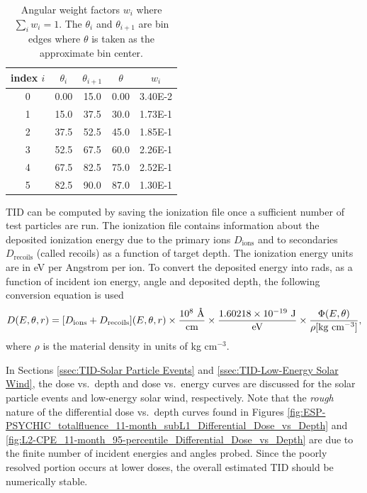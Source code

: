 \documentclass{hitec}
\newcommand{\angstrom}{\mbox{\normalfont\AA}}
\begin{document}
\begin{table}[h]\centering
	\caption{Angular weight factors $w_i$ where $\sum_i w_i = 1$. The $\theta_i$ and $\theta_{i+1}$ are bin edges where $\theta$ is taken as the approximate bin center.}\label{tab:incidentAngleBins}
	\begin{tabular}{|c | c | c | c | c |}\hline
		index $i$ & $\theta_i$ & $\theta_{i+1}$ & $\theta$ & $w_i$ \\\hline
		0  & 0.00 & 15.0 & 0.00 & 3.40E-2 \\\hline
		1  & 15.0 & 37.5 & 30.0 & 1.73E-1 \\\hline
		2  & 37.5 & 52.5 & 45.0 & 1.85E-1\\\hline
		3  & 52.5 & 67.5 & 60.0 & 2.26E-1 \\\hline
		4  & 67.5 & 82.5 & 75.0 & 2.52E-1\\\hline
		5  & 82.5 & 90.0 & 87.0 & 1.30E-1\\\hline
	\end{tabular}
\end{table}

TID can be computed by saving the ionization file once a sufficient number of test particles are run. The ionization file contains information about the deposited ionization energy due to the primary ions $D_{\text{ions}}$ and to secondaries $D_{\text{recoils}}$ (called recoils) as a function of target depth. The ionization energy units are in eV per Angstrom per ion. To convert the deposited energy into rads, as a function of incident ion energy, angle and deposited depth, the following conversion equation is used
\begin{equation}
	D(E,\theta,r) = [D_{\text{ions}} + D_{\text{recoils}}](E,\theta,r) \times \frac{10^8 \text{ \si{\angstrom}}}{\text{cm}} \times \frac{1.60218\times 10^{-19} \text{ J}}{\text{eV}} \times \frac{\Phi(E,\theta)}{\rho[\text{kg cm$^{-3}$}]} ,
\end{equation}
where $\rho$ is the material density in units of kg cm$^{-3}$.

In Sections \ref{ssec:TID-Solar Particle Events} and \ref{ssec:TID-Low-Energy Solar Wind}, the dose vs.\ depth and dose vs.\ energy curves are discussed for the solar particle events and low-energy solar wind, respectively. Note that the \textit{rough} nature of the differential dose vs.\ depth curves found in Figures \ref{fig:ESP-PSYCHIC_totalfluence_11-month_subL1_Differential_Dose_vs_Depth} and \ref{fig:L2-CPE_11-month_95-percentile_Differential_Dose_vs_Depth} are due to the finite number of incident energies and angles probed. Since the poorly resolved portion occurs at lower doses, the overall estimated TID should be numerically stable.
\end{document}
